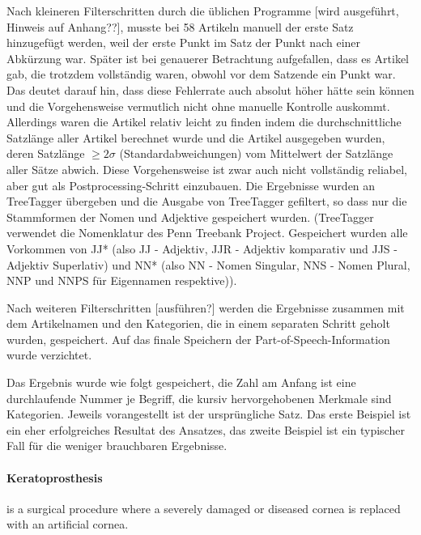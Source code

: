\documentclass[pagesize,DIV=calc,12pt,draft]{scrreprt}
\begin{document}
\begin{inparaenum}
\item
  Nach kleineren Filterschritten durch die üblichen Programme {[}wird
  ausgeführt, Hinweis auf Anhang??{]}, musste bei 58 Artikeln manuell
  der erste Satz hinzugefügt werden, weil der erste Punkt im Satz der
  Punkt nach einer Abkürzung war. Später ist bei genauerer Betrachtung
  aufgefallen, dass es Artikel gab, die trotzdem vollständig waren,
  obwohl vor dem Satzende ein Punkt war. Das deutet darauf hin, dass
  diese Fehlerrate auch absolut höher hätte sein können und die
  Vorgehensweise vermutlich nicht ohne manuelle Kontrolle auskommt.
  Allerdings waren die Artikel relativ leicht zu finden indem die
  durchschnittliche Satzlänge aller Artikel berechnet wurde und die
  Artikel ausgegeben wurden, deren Satzlänge $\geq 2 \sigma $
  (Standardabweichungen) vom Mittelwert der Satzlänge aller Sätze abwich. Diese Vorgehensweise ist
  zwar auch nicht vollständig reliabel, aber gut als
  Postprocessing-Schritt einzubauen. Die Ergebnisse wurden an TreeTagger
  übergeben und die Ausgabe von TreeTagger gefiltert, so dass nur die
  Stammformen der Nomen und Adjektive gespeichert wurden. (TreeTagger
  verwendet die Nomenklatur des Penn Treebank Project. Gespeichert
  wurden alle Vorkommen von JJ* (also JJ - Adjektiv, JJR - Adjektiv
  komparativ und JJS - Adjektiv Superlativ) und NN* (also NN - Nomen
  Singular, NNS - Nomen Plural, NNP und NNPS für Eigennamen
  respektive)).

\item
  Nach weiteren Filterschritten {[}ausführen?{]} werden die Ergebnisse
  zusammen mit dem Artikelnamen und den Kategorien, die in einem
  separaten Schritt geholt wurden, gespeichert. Auf das finale Speichern
  der Part-of-Speech-Information wurde verzichtet.
\end{inparaenum}


Das Ergebnis wurde wie folgt gespeichert, die Zahl am Anfang ist eine
durchlaufende Nummer je Begriff, die kursiv hervorgehobenen Merkmale
sind Kategorien. Jeweils vorangestellt ist der ursprüngliche Satz. Das erste Beispiel ist ein eher erfolgreiches Resultat des Ansatzes, das
zweite Beispiel ist ein typischer Fall für die weniger brauchbaren
Ergebnisse.

\paragraph{Keratoprosthesis} is a surgical procedure where a severely damaged or diseased cornea is replaced with an artificial cornea.
\end{document}
